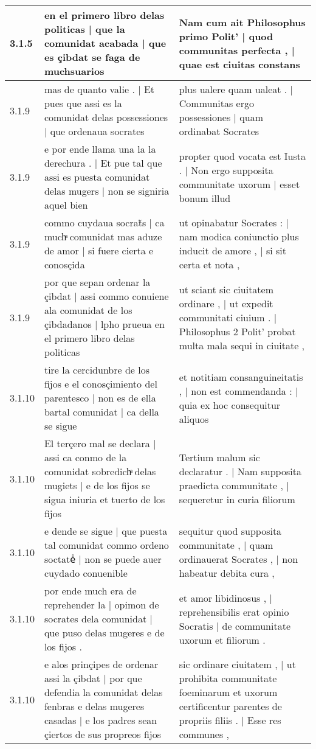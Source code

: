 \begin{tabular}{|p{1cm}|p{6.5cm}|p{6.5cm}|}
3.1.5 & en el primero libro delas politicas | que la comunidat acabada | que es çibdat se faga de muchsuarios & Nam cum ait Philosophus primo Polit’ | quod communitas perfecta , | quae est ciuitas constans \\\hline
3.1.9 & mas de quanto valie . | Et pues que assi es la comunidat delas possessiones | que ordenaua socrates & plus ualere quam ualeat . | Communitas ergo possessiones | quam ordinabat Socrates \\\hline
3.1.9 & e por ende llama una la la derechura . | Et pue tal que assi es puesta comunidat delas mugers | non se signiria aquel bien & propter quod vocata est Iusta . | Non ergo supposita communitate uxorum | esset bonum illud \\\hline
3.1.9 & commo cuydaua socrat̃s | ca muchͣ comunidat mas aduze de amor | si fuere cierta e conosçida & ut opinabatur Socrates : | nam modica coniunctio plus inducit de amore , | si sit certa et nota , \\\hline
3.1.9 & por que sepan ordenar la çibdat | assi commo conuiene ala comunidat de los çibdadanos | lpho prueua en el primero libro delas politicas & ut sciant sic ciuitatem ordinare , | ut expedit communitati ciuium . | Philosophus 2 Polit’ probat multa mala sequi in ciuitate , \\\hline
3.1.10 & tire la cercidunbre de los fijos e el conosçimiento del parentesco | non es de ella bartal comunidat | ca della se sigue & et notitiam consanguineitatis , | non est commendanda : | quia ex hoc consequitur aliquos \\\hline
3.1.10 & El terçero mal se declara | assi ca conmo de la comunidat sobredichͣ delas mugiets | e de los fijos se sigua iniuria et tuerto de los fijos & Tertium malum sic declaratur . | Nam supposita praedicta communitate , | sequeretur in curia filiorum \\\hline
3.1.10 & e dende se sigue | que puesta tal comunidat commo ordeno soctateᷤ | non se puede auer cuydado conuenible & sequitur quod supposita communitate , | quam ordinauerat Socrates , | non habeatur debita cura , \\\hline
3.1.10 & por ende much era de reprehender la | opimon de socrates dela comunidat | que puso delas mugeres e de los fijos . & et amor libidinosus , | reprehensibilis erat opinio Socratis | de communitate uxorum et filiorum . \\\hline
3.1.10 & e alos prinçipes de ordenar assi la çibdat | por que defendia la comunidat delas fenbras e delas mugeres casadas | e los padres sean çiertos de sus propreos fijos & sic ordinare ciuitatem , | ut prohibita communitate foeminarum et uxorum certificentur parentes de propriis filiis . | Esse res communes , \\\hline

\end{tabular}
